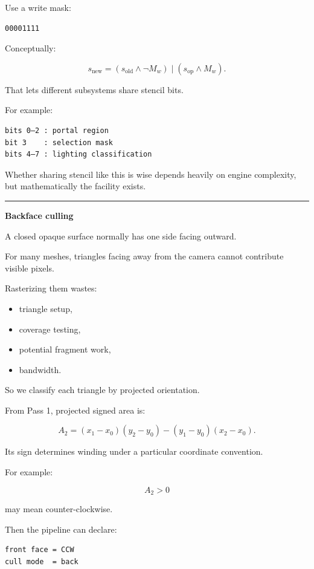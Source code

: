 Use a write mask:

\begin{verbatim}
00001111
\end{verbatim}

Conceptually:

\[
s_{\text{new}}
=
(s_{\text{old}}\land\neg M_w)
\;|\;
(s_{\text{op}}\land M_w).
\]

That lets different subsystems share stencil bits.

For example:

\begin{verbatim}
bits 0–2 : portal region
bit 3    : selection mask
bits 4–7 : lighting classification
\end{verbatim}

Whether sharing stencil like this is wise depends heavily on engine complexity, but mathematically the facility exists.

\begin{center}\rule{0.5\linewidth}{0.5pt}\end{center}

\textbf{Backface culling}

A closed opaque surface normally has one side facing outward.

For many meshes, triangles facing away from the camera cannot contribute visible pixels.

Rasterizing them wastes:

\begin{itemize}
\tightlist
\item
  triangle setup,
\item
  coverage testing,
\item
  potential fragment work,
\item
  bandwidth.
\end{itemize}

So we classify each triangle by projected orientation.

From Pass 1, projected signed area is:

\[
A_2 =
(x_1-x_0)(y_2-y_0)
-
(y_1-y_0)(x_2-x_0).
\]

Its sign determines winding under a particular coordinate convention.

For example:

\[
A_2>0
\]

may mean counter-clockwise.

Then the pipeline can declare:

\begin{verbatim}
front face = CCW
cull mode  = back
\end{verbatim}

